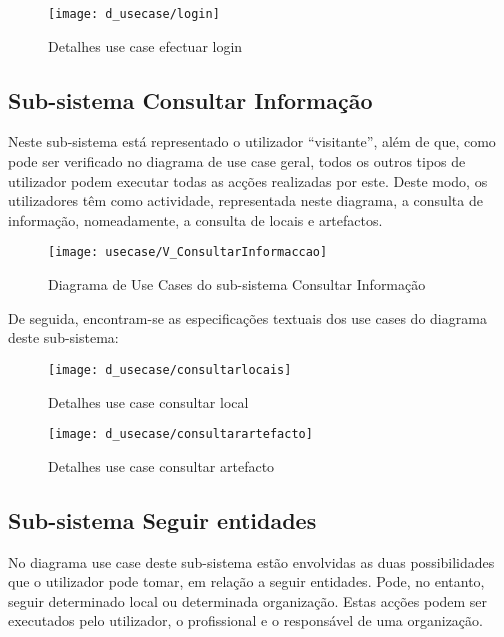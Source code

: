 \documentclass[12pt,a4paper]{article}
\begin{document}
\clearpage
\newpage

\begin{figure}[h!]
\centering
\texttt{[image: d\_usecase/login]}
\label{usecase}
\caption{Detalhes use case efectuar login}
\end{figure}

\subsection{Sub-sistema Consultar Informação}
Neste sub-sistema está representado o utilizador ``visitante'', além de que, como pode ser verificado no diagrama de use case geral, todos os outros tipos de utilizador podem executar todas as acções realizadas por este. Deste modo, os utilizadores têm como actividade, representada neste diagrama, a consulta de informação, nomeadamente, a consulta de locais e artefactos.\\

\begin{figure}[h!]
\centering
\texttt{[image: usecase/V\_ConsultarInformaccao]}
\label{usecase}
\caption{Diagrama de Use Cases do sub-sistema Consultar Informação}
\end{figure}

De seguida, encontram-se as especificações textuais dos use cases do diagrama deste sub-sistema:\\


\begin{figure}[h!]
\centering
\texttt{[image: d\_usecase/consultarlocais]}
\label{usecase}
\caption{Detalhes use case consultar local}
\end{figure}


\begin{figure}[h!]
\centering
\texttt{[image: d\_usecase/consultarartefacto]}
\label{usecase}
\caption{Detalhes use case consultar artefacto}
\end{figure}

\subsection{Sub-sistema Seguir entidades}
No diagrama use case deste sub-sistema estão envolvidas as duas possibilidades que o utilizador pode tomar, em relação a seguir entidades. Pode, no entanto, seguir determinado local ou determinada organização. Estas acções podem ser executados pelo utilizador, o profissional e o responsável de uma organização.\\
\end{document}
